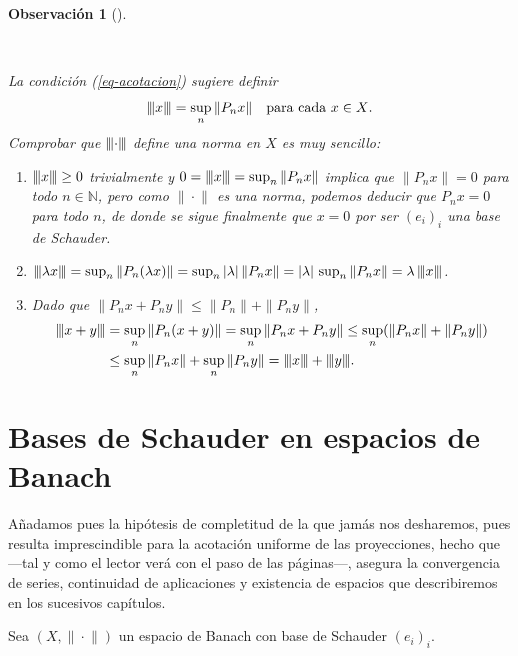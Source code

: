 \documentclass[
  spanish,
  letterpaper,
  DIV=11,
  numbers=noendperiod]{scrreprt}
\theoremstyle{definition}
\theoremstyle{remark}
\theoremstyle{definition}
\theoremstyle{exampstyle}
\def\N{\ensuremath{\mathbb{N}}} %
\newcommand{\vertiii}[1]{{\left\vert\kern-0.25ex\left\vert\kern-0.25ex\left\vert #1 
    \right\vert\kern-0.25ex\right\vert\kern-0.25ex\right\vert}}
\newcommand{\vertiii}[1]{{\left\vert\kern-0.25ex\left\vert\kern-0.25ex\left\vert #1 
    \right\vert\kern-0.25ex\right\vert\kern-0.25ex\right\vert}}
\def\N{\ensuremath{\mathbb{N}}} %
\theoremstyle{plain}
\newtheorem{conjecture}{Observación}[chapter]
\theoremstyle{plain}
\theoremstyle{definition}
\theoremstyle{plain}
\theoremstyle{remark}
\begin{document}
\begin{conjecture}[]\protect\hypertarget{cnj-2}{}\label{cnj-2}

~

\hspace*{1cm}

La condición (\ref{eq-acotacion}) sugiere definir \[
\vertiii{x}=\sup_n\|P_nx\|\quad\text{para cada $x\in X$.}
\] Comprobar que \(\vertiii{\cdot}\) define una norma en \(X\) es muy
sencillo:

\begin{enumerate}
\def\labelenumi{\arabic{enumi}.}
\item
  \(\vertiii{x}\geq 0\) trivialmente y
  \(0=\vertiii{x}=\sup_{n}{\|P_nx\|}\) implica que \(\|P_nx\|=0\) para
  todo \(n\in\N\), pero como \(\|\!\cdot\!\|\) es una norma, podemos
  deducir que \(P_nx=0\) para todo \(n\), de donde se sigue finalmente
  que \(x=0\) por ser \((e_i)_i\) una base de Schauder.
\item
  \(\vertiii{\lambda x}=\sup_n\|P_n(\lambda x)\|=\sup_n|\lambda|\,\|P_nx\|=|\lambda|\, \sup_n\|P_nx\|=\lambda\,\vertiii{x}\).
\item
  Dado que \(\|P_nx+P_ny\|\leq \|P_n\|+\|P_ny\|\),
  \begin{align*}
   \vertiii{x+y}&=\sup_n\|P_n(x+y)\|=\sup_n\|P_nx + P_ny\|\leq\sup_n(\|P_nx\|+\|P_ny\|)\\ 
   &\leq\sup_n\|P_nx\|+\sup_n\|P_ny\|= \vertiii{x} + \vertiii{y}.
  \end{align*}
\end{enumerate}

\end{conjecture}

\section{Bases de Schauder en espacios de
Banach}\label{bases-de-schauder-en-espacios-de-banach}

Añadamos pues la hipótesis de completitud de la que jamás nos
desharemos, pues resulta imprescindible para la acotación uniforme de
las proyecciones, hecho que ---tal y como el lector verá con el paso de
las páginas---, asegura la convergencia de series, continuidad de
aplicaciones y existencia de espacios que describiremos en los sucesivos
capítulos.

Sea \((X,\|\!\cdot\!\|)\) un espacio de Banach con base de Schauder
\((e_i)_i\).
\end{document}
